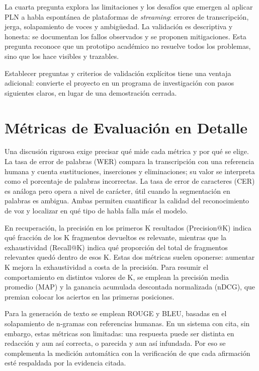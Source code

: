 \documentclass[12pt,a4paper]{article}
\begin{document}
La cuarta pregunta explora las limitaciones y los desafíos que emergen al aplicar PLN a habla espontánea de plataformas de \emph{streaming}: errores de transcripción, jerga, solapamiento de voces y ambigüedad. La validación es descriptiva y honesta: se documentan los fallos observados y se proponen mitigaciones. Esta pregunta reconoce que un prototipo académico no resuelve todos los problemas, sino que los hace visibles y trazables.

Establecer preguntas y criterios de validación explícitos tiene una ventaja adicional: convierte el proyecto en un programa de investigación con pasos siguientes claros, en lugar de una demostración cerrada.



\section{Métricas de Evaluación en Detalle}
\label{sec:metricas}

Una discusión rigurosa exige precisar qué mide cada métrica y por qué se elige. La tasa de error de palabras (WER) compara la transcripción con una referencia humana y cuenta sustituciones, inserciones y eliminaciones; su valor se interpreta como el porcentaje de palabras incorrectas. La tasa de error de caracteres (CER) es análoga pero opera a nivel de carácter, útil cuando la segmentación en palabras es ambigua. Ambas permiten cuantificar la calidad del reconocimiento de voz y localizar en qué tipo de habla falla más el modelo.

En recuperación, la precisión en los primeros K resultados (Precision@K) indica qué fracción de los K fragmentos devueltos es relevante, mientras que la exhaustividad (Recall@K) indica qué proporción del total de fragmentos relevantes quedó dentro de esos K. Estas dos métricas suelen oponerse: aumentar K mejora la exhaustividad a costa de la precisión. Para resumir el comportamiento en distintos valores de K, se emplean la precisión media promedio (MAP) y la ganancia acumulada descontada normalizada (nDCG), que premian colocar los aciertos en las primeras posiciones.

Para la generación de texto se emplean ROUGE y BLEU, basadas en el solapamiento de n-gramas con referencias humanas. En un sistema con cita, sin embargo, estas métricas son limitadas: una respuesta puede ser distinta en redacción y aun así correcta, o parecida y aun así infundada. Por eso se complementa la medición automática con la verificación de que cada afirmación esté respaldada por la evidencia citada.
\end{document}
